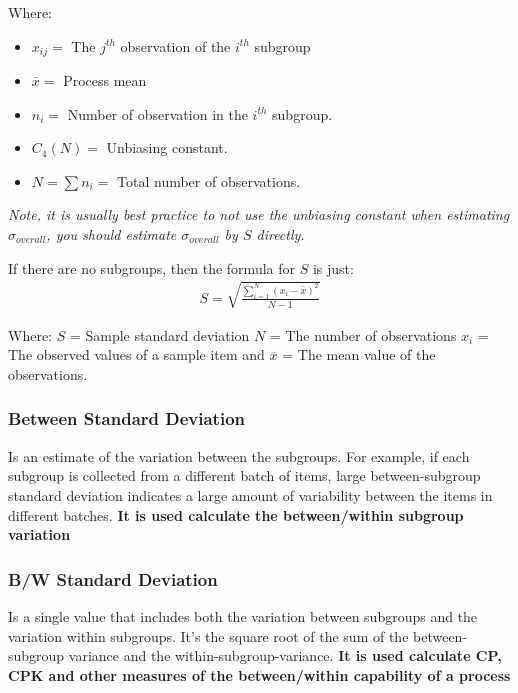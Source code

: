 \documentclass[11pt]{article}
\begin{document}
Where: 
\begin{itemize}
  \item \(x_{ij} = \) The \(j^{th}\) observation of the \(i^{th}\) subgroup 
  \item  \(\bar x =\) Process mean 
  \item \(n_i = \) Number of observation in the \(i^{th}\) subgroup.
  \item \(C_4(N) = \) Unbiasing constant. 
  \item \(N = \sum n_i =\) Total number of observations.
\end{itemize}


\emph{Note, it is usually best practice to not use the unbiasing
constant when estimating \(\sigma_{overall}\), you should estimate
\(\sigma_{overall}\) by \(S\) directly.}

If there are no subgroups, then the formula for \(S\) is just:
\begin{gather}
  S = \sqrt{\frac{\sum^N_{i=1} (x_i - \bar x)^2}{N-1}}
\end{gather}

Where: \(S\) = Sample standard deviation \(N\) = The number of
observations \(x_i\) = The observed values of a sample item and
\(\overline {x}\) = The mean value of the observations.

\hypertarget{between-standard-deviation}{%
\subsubsection{Between Standard
Deviation}\label{between-standard-deviation}}

Is an estimate of the variation between the subgroups. For example, if
each subgroup is collected from a different batch of items, large
between-subgroup standard deviation indicates a large amount of
variability between the items in different batches. \textbf{It is used
calculate the between/within subgroup variation}

\hypertarget{bw-standard-deviation}{%
\subsubsection{B/W Standard Deviation}\label{bw-standard-deviation}}

Is a single value that includes both the variation between subgroups and
the variation within subgroups. It's the square root of the sum of the
between-subgroup variance and the within-subgroup-variance. \textbf{It
is used calculate CP, CPK and other measures of the between/within
capability of a process}
\end{document}

